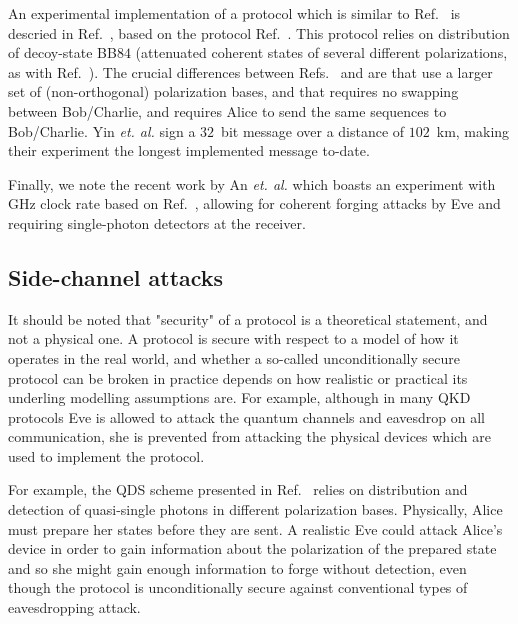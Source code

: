 An experimental implementation of a protocol which is similar to Ref.~\cite{Amiri2016} is descried in Ref.~\cite{Yin2017c}, based on the protocol Ref.~\cite{Yin2016a}. This protocol relies on distribution of decoy-state BB$84$ (attenuated coherent states of several different polarizations, as with Ref.~\cite{Amiri2016}). The crucial differences between Refs.~\cite{Amiri2016} and \cite{Yin2017c, Yin2016a} are that \cite{Yin2017c, Yin2016a} use a larger set of (non-orthogonal) polarization bases, and that \cite{Yin2017c, Yin2016a} requires no swapping between Bob/Charlie, and requires Alice to send the same sequences to Bob/Charlie. Yin \emph{et. al.} sign a $32$~bit message over a distance of $102$~km, making their experiment the longest implemented message to-date.



Finally, we note the recent work by An \emph{et. al.} \cite{An2019} which boasts an experiment with GHz clock rate based on Ref.~\cite{Amiri2016}, allowing for coherent forging attacks by Eve and requiring single-photon detectors at the receiver.


\subsection*{Side-channel attacks}
It should be noted that "security" of a protocol is a theoretical statement, and not a physical one. A protocol is secure with respect to a model of how it operates in the real world, and whether a so-called unconditionally secure protocol can be broken in practice depends on how realistic or practical its underling modelling assumptions are. For example, although in many QKD protocols Eve is allowed to attack the quantum channels and eavesdrop on all communication, she is prevented from attacking the physical devices which are used to implement the protocol. 

For example, the QDS scheme presented in Ref.~\cite{Amiri2016} relies on distribution and detection of quasi-single photons  in different polarization bases. Physically, Alice must prepare her states before they are sent. A realistic Eve could attack Alice's device in order to gain information about the polarization of the prepared state and so she might gain enough information to forge without detection, even though the protocol is unconditionally secure against conventional types of eavesdropping attack.

